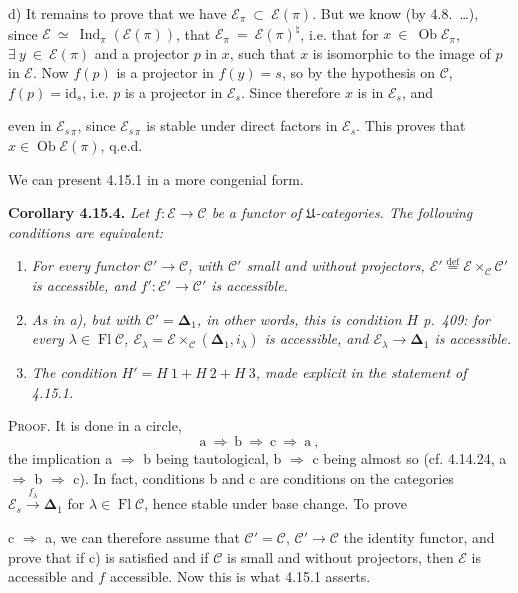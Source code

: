 \documentclass[11pt]{article}
\newcommand{\msp}[1]{\marginpar{\footnotesize [#1]}}
\newcommand{\cE}{\mathcal{E}}
\newcommand{\cC}{\mathcal{C}}
\newcommand{\Ob}{\operatorname{Ob}}
\newcommand{\Fl}{\operatorname{Fl}}
\newcommand{\Ind}{\operatorname{Ind}}
\newcommand{\id}{\mathrm{id}}
\begin{document}
d) It remains to prove that we have $\cE_{\pi} \ \subset \ \cE(\pi)$. But we know (by 4.8.~\dots), since $\cE \ \simeq \ \Ind_{\pi}(\cE(\pi))$, that $\cE_{\pi} \ = \ \cE(\pi)^{\natural}$, i.e. that for $x \ \in \ \Ob \cE_{\pi}$, $\exists \ y \ \in \ \cE(\pi)$ and a projector $p$ in $x$, such that $x$ is isomorphic to the image of $p$ in $\cE$. Now $f(p)$ is a projector in $f(y) = s$, so by the hypothesis on $\cC$, $f(p) = \id_s$, i.e. $p$ is a projector in $\cE_s$. Since therefore $x$ is in $\cE_s$, and

\msp{page 432}even in $\cE_{s\,\pi}$, since $\cE_{s\,\pi}$ is stable under direct factors in $\cE_s$. This proves that $x \in \Ob \cE(\pi)$, q.e.d.

We can present 4.15.1 in a more congenial form.

\textbf{Corollary 4.15.4.} \textit{Let $f : \cE \longrightarrow \cC$ be a functor of $\mathfrak{U}$-categories. The following conditions are equivalent:}
\begin{enumerate}
\item[\textit{a)}] \textit{For every functor $\cC' \longrightarrow \cC$, with $\cC'$ small and without projectors, $\cE' \overset{\text{def}}{=} \cE \times_{\cC} \cC'$ is accessible, and $f' : \cE' \longrightarrow \cC'$ is accessible.}
\item[\textit{b)}] \textit{As in a), but with $\cC' = \mathbf{\Delta}_1$, in other words, this is condition $H$ p.~409: for every $\lambda \in \Fl \cC$, $\cE_{\lambda} = \cE \times_{\cC} (\mathbf{\Delta}_1, i_{\lambda})$ is accessible, and $\cE_{\lambda} \longrightarrow \mathbf{\Delta}_1$ is accessible.}
\item[\textit{c)}] \textit{The condition $H' = H\ \mathit{1} + H\ \mathit{2} + H\ \mathit{3}$, made explicit in the statement of 4.15.1.}
\end{enumerate}
\textsc{Proof}. It is done in a circle,
\[
\mathrm{a} \ \Longrightarrow \ \mathrm{b} \ \Longrightarrow \ \mathrm{c} \ \Longrightarrow \ \mathrm{a} \ ,
\]
the implication a $\Longrightarrow$ b being tautological, b $\Longrightarrow$ c being almost so (cf. 4.14.24, a $\Longrightarrow$ b $\Longrightarrow$ c). In fact, conditions b and c are conditions on the categories $\cE_s \xrightarrow{f_{\lambda}} \mathbf{\Delta}_1$ for $\lambda \in \Fl \cC$, hence stable under base change. To prove

\msp{page 433}c $\Longrightarrow$ a, we can therefore assume that $\cC' = \cC$, $\cC' \longrightarrow \cC$ the identity functor, and prove that if c) is satisfied and if $\cC$ is small and without projectors, then $\cE$ is accessible and $f$ accessible. Now this is what 4.15.1 asserts.
\end{document}
